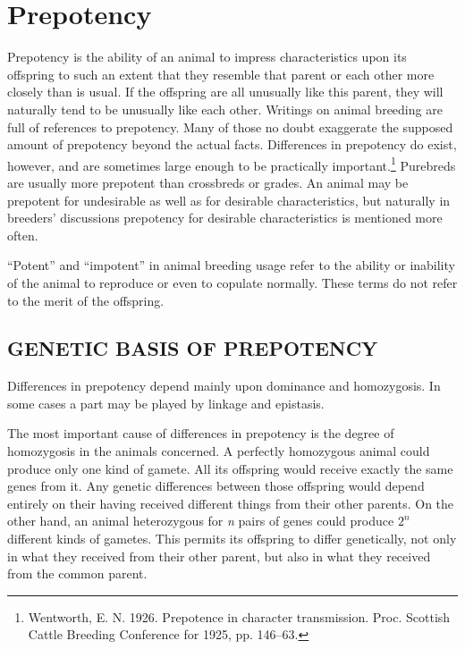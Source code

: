 \chapter{Prepotency}
\label{cha:Lush_Chapter_22}

Prepotency is the ability of an animal to impress characteristics
upon its offspring to such an extent that they resemble that parent or
each other more closely than is usual. If the offspring are all unusually
like this parent, they will naturally tend to be unusually like each other.
Writings on animal breeding are full of references to prepotency. Many
of those no doubt exaggerate the supposed amount of prepotency
beyond the actual facts. Differences in prepotency do exist, however,
and are sometimes large enough to be practically important.\footnote{Wentworth,
E. N. 1926. Prepotence in character transmission. Proc. Scottish
Cattle Breeding Conference for 1925, pp. 146--63.} Purebreds
are usually more prepotent than crossbreds or grades. An animal may
be prepotent for undesirable as well as for desirable characteristics, but
naturally in breeders' discussions prepotency for desirable characteristics
is mentioned more often.

``Potent'' and ``impotent'' in animal breeding usage refer to the
ability or inability of the animal to reproduce or even to copulate normally.
These terms do not refer to the merit of the offspring.

\section*{GENETIC BASIS OF PREPOTENCY}

Differences in prepotency depend mainly upon dominance and
homozygosis. In some cases a part may be played by linkage and
epistasis.

The most important cause of differences in prepotency is the degree
of homozygosis in the animals concerned. A perfectly homozygous animal
could produce only one kind of gamete. All its offspring would
receive exactly the same genes from it. Any genetic differences between
those offspring would depend entirely on their having received different
things from their other parents. On the other hand, an animal heterozygous
for \textit{n} pairs of genes could produce $2^n$ different kinds of gametes.
This permits its offspring to differ genetically, not only in what they
received from their other parent, but also in what they received from
the common parent.

